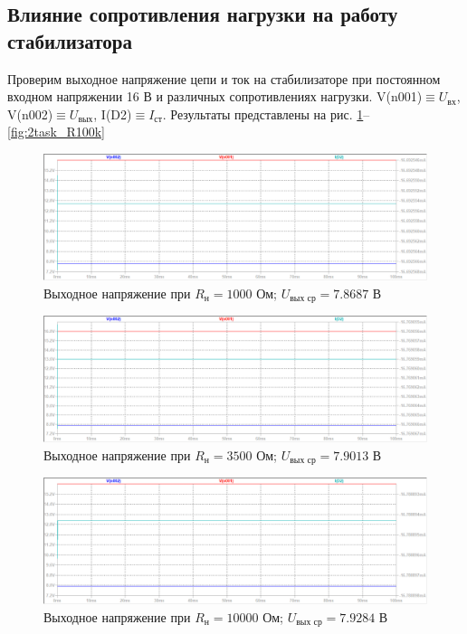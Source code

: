 \documentclass[a4paper, 12pt]{article}
\begin{document}
    \subsection{Влияние сопротивления нагрузки на работу стабилизатора}
    Проверим выходное напряжение цепи и ток на стабилизаторе при постоянном
    входном напряжении 16 В и различных сопротивлениях нагрузки. V(n001)$\equiv U_{\text{вх}}$,
    V(n002)$\equiv U_{\text{вых}}$, I(D2)$\equiv I_{\text{ст}}$. Результаты представлены на рис.
    \ref{fig:2task_R1k}--\ref{fig:2task_R100k}
    \begin{figure}[H]
        \centering
        \includegraphics[scale=0.46]{2task_R1k.png}
        \captionsetup{skip=0pt}
        \caption{Выходное напряжение при $R_{\text{н}}=1000$ Ом; $U_{\text{вых ср}}=7.8687$ В}
        \label{fig:2task_R1k}
    \end{figure}
    \begin{figure}[H]
        \centering
        \includegraphics[scale=0.46]{2task_R3_5k.png}
        \captionsetup{skip=0pt}
        \caption{Выходное напряжение при $R_{\text{н}}=3500$ Ом; $U_{\text{вых ср}}=7.9013$ В}
        \label{fig:2task_R3_5k}
    \end{figure}
    \begin{figure}[H]
        \centering
        \includegraphics[scale=0.46]{2task_R10k.png}
        \captionsetup{skip=0pt}
        \caption{Выходное напряжение при $R_{\text{н}}=10000$ Ом; $U_{\text{вых ср}}=7.9284$ В}
        \label{fig:2task_R10k}
    \end{figure}
\end{document}
